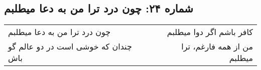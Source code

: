 \begin{center}
\section*{شماره ۲۴: چون درد ترا من به دعا میطلبم}
\label{sec:024}
\begin{longtable}{l p{0.5cm} r}
چون درد ترا من به دعا میطلبم
&&
کافر باشم اگر دوا میطلبم
\\
چندان که خوشی است در دو عالم گو باش
&&
من از همه فارغم، ترا میطلبم
\\
\end{longtable}
\end{center}
